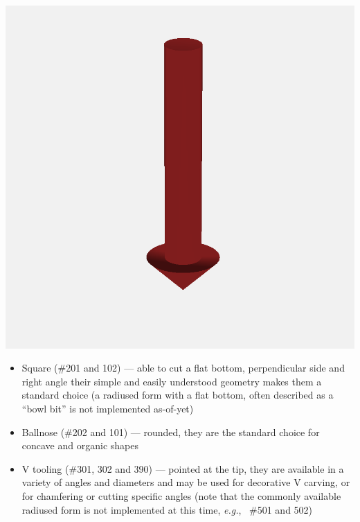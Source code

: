 \documentclass{ltxdoc}
\begin{document}
\begin{samepage}
           \includegraphics[width=\linewidth/3]{images/tool_V_301.png}%

\begin{itemize}
\item Square (\#201 and 102) --- able to cut a flat bottom, perpendicular side and right angle
                                 their simple and easily understood geometry makes them a 
                                 standard choice (a radiused form with a flat bottom, often
                                 described as a ``bowl bit'' is not implemented as-of-yet)
\item Ballnose (\#202 and 101) --- rounded, they are the standard choice for concave and 
                                   organic shapes
\item V tooling (\#301, 302 and 390) --- pointed at the tip, they are available in a variety of
                                         angles and diameters and may be used for decorative
                                         V carving, or for chamfering or cutting specific angles
                                         (note that the commonly available radiused form is not
                                         implemented at this time, \emph{e.g.}, ~\#501 and 502)
\end{itemize}
\end{samepage}
\end{document}
